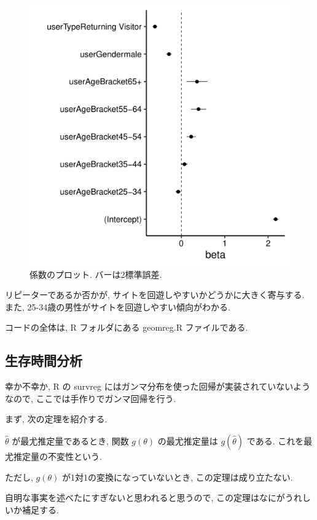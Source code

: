 \documentclass[a4paper, 12pt]{jarticle}
\begin{document}
\begin{figure}
\includegraphics[width=13cm,clip]{./img/coefgeomreg.pdf}
\caption{係数のプロット. バーは2標準誤差.}
\label{coefgeomreg}
\end{figure}

リピーターであるか否かが, サイトを回遊しやすいかどうかに大きく寄与する. 
また, 25-34歳の男性がサイトを回遊しやすい傾向がわかる. 

コードの全体は, R フォルダにある geomreg.R ファイルである. 

\subsection{生存時間分析}
幸か不幸か, R の survreg にはガンマ分布を使った回帰が実装されていないようなので, ここでは手作りでガンマ回帰を行う. 

まず, 次の定理を紹介する. 

\begin{theorem}
$\hat \theta$ が最尤推定量であるとき, 関数 $g(\theta)$ の最尤推定量は $g(\hat \theta)$ である. これを最尤推定量の不変性という.
\end{theorem}
ただし, $g(\theta)$ が1対1の変換になっていないとき, この定理は成り立たない. 

自明な事実を述べたにすぎないと思われると思うので, この定理はなにがうれしいか補足する.
\end{document}

